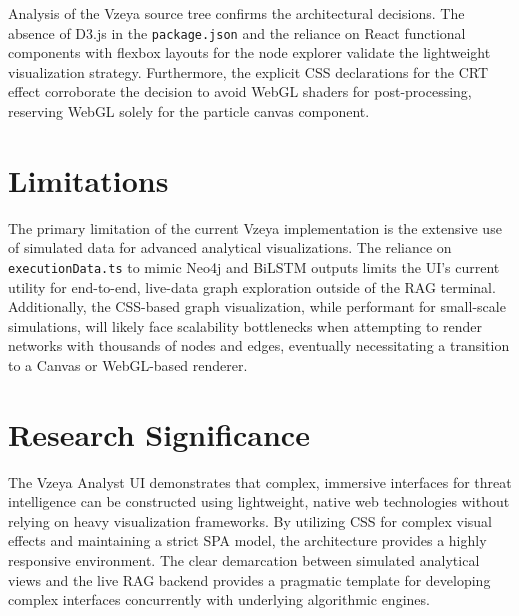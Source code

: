 Analysis of the Vzeya source tree confirms the architectural decisions. The absence of D3.js in the \texttt{package.json} and the reliance on React functional components with flexbox layouts for the node explorer validate the lightweight visualization strategy. Furthermore, the explicit CSS declarations for the CRT effect corroborate the decision to avoid WebGL shaders for post-processing, reserving WebGL solely for the particle canvas component. 

\section{Limitations}

The primary limitation of the current Vzeya implementation is the extensive use of simulated data for advanced analytical visualizations. The reliance on \texttt{executionData.ts} to mimic Neo4j and BiLSTM outputs limits the UI's current utility for end-to-end, live-data graph exploration outside of the RAG terminal. Additionally, the CSS-based graph visualization, while performant for small-scale simulations, will likely face scalability bottlenecks when attempting to render networks with thousands of nodes and edges, eventually necessitating a transition to a Canvas or WebGL-based renderer.

\section{Research Significance}

The Vzeya Analyst UI demonstrates that complex, immersive interfaces for threat intelligence can be constructed using lightweight, native web technologies without relying on heavy visualization frameworks. By utilizing CSS for complex visual effects and maintaining a strict SPA model, the architecture provides a highly responsive environment. The clear demarcation between simulated analytical views and the live RAG backend provides a pragmatic template for developing complex interfaces concurrently with underlying algorithmic engines.
